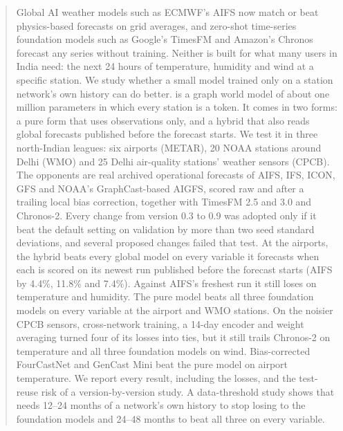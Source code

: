 \begin{abstract}
Global AI weather models such as ECMWF's AIFS now match or beat physics-based forecasts on grid averages, and
zero-shot time-series foundation models such as Google's TimesFM and Amazon's Chronos forecast any series without
training. Neither is built for what many users in India need: the next 24 hours of temperature, humidity and wind
at a specific station. We study whether a small model trained only on a station network's own history can do
better. \pwm is a graph world model of about one million parameters in which every station is a token. It comes in two forms:
a pure form that uses observations only, and a hybrid that also reads global forecasts published before the
forecast starts. We test it in three north-Indian leagues: six airports (METAR), 20 NOAA stations around Delhi
(WMO) and 25 Delhi air-quality stations' weather sensors (CPCB). The opponents are real archived operational
forecasts of AIFS, IFS, ICON, GFS and NOAA's GraphCast-based AIGFS, scored raw and after a trailing local bias
correction, together with TimesFM 2.5 and 3.0 and Chronos-2. Every change from version 0.3 to 0.9 was adopted only
if it beat the default setting on validation by more than two seed standard deviations, and several proposed
changes failed that test. At the airports, the hybrid beats every global model on every variable it forecasts when each is scored on its newest
run published before the forecast starts (AIFS by 4.4\%, 11.8\% and 7.4\%). Against AIFS's freshest run it still
loses on temperature and humidity. The pure model beats all three foundation models on every variable at the
airport and WMO stations. On the noisier CPCB sensors, cross-network training, a 14-day encoder and weight averaging
turned four of its losses into ties, but it still trails Chronos-2 on temperature and all three foundation models on wind. Bias-corrected FourCastNet and GenCast
Mini beat the pure model on airport temperature. We report every result, including the losses, and the test-reuse
risk of a version-by-version study. A data-threshold study shows that \pwm needs 12--24 months of a network's own
history to stop losing to the foundation models and 24--48 months to beat all three on every variable.
\end{abstract}
